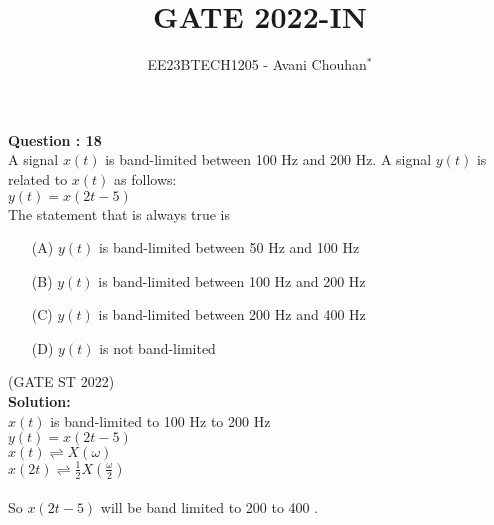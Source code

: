 \documentclass[journal,12pt,twocolumn]{IEEEtran}
\theoremstyle{remark}
\begin{document}

\vspace{3cm}

\title{GATE 2022-IN}
\author{EE23BTECH1205 - Avani Chouhan$^{*}$
}
\maketitle
\newpage
\bigskip

\renewcommand{\thefigure}{\theenumi}
\renewcommand{\thetable}{\theenumi}

\vspace{3cm}
\textbf{Question : 18} \\
A signal \( x(t) \) is band-limited between 100 Hz and 200 Hz. A signal \( y(t) \) is related to \( x(t) \) as follows:\\

\( y(t) = x(2t - 5) \)\\
The statement that is always true is \\

\begin{enumerate}
  \item[(A)] \( y(t) \) is band-limited between 50 Hz and 100 Hz
  \item[(B)] \( y(t) \) is band-limited between 100 Hz and 200 Hz
  \item[(C)] \( y(t) \) is band-limited between 200 Hz and 400 Hz
  \item[(D)] \( y(t) \) is not band-limited 
\end{enumerate}

\hfill{(GATE ST 2022)}\\
\textbf{Solution:} \\

\( x(t) \) is band-limited to 100 Hz to 200 Hz \\
$y(t) = x(2t - 5)$ \\
$x(t) \rightleftharpoons X(\omega)$ \\
$x(2t) \rightleftharpoons \frac{1}{2} X\left(\frac{\omega}{2}\right)$ \\
 \\
So \( x(2t - 5) \) will be band limited to 200 to 400 .
\end{document}

